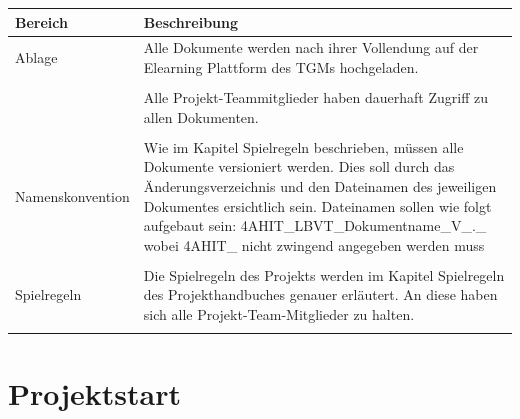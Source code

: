 \begingroup
\renewcommand*{\arraystretch}{1.1} %
\begin{center}
\begin{tabularx}{\textwidth}{|p{3.2cm}|X|}

    \hline
     \color{white}\textbf{Bereich} & \color{white}\textbf{Beschreibung} \\
    \hline
    Ablage & Alle Dokumente werden nach ihrer Vollendung auf der Elearning Plattform des TGMs hochgeladen. \\
    & \\
    \hline
     & Alle Projekt-Teammitglieder haben dauerhaft Zugriff zu allen Dokumenten.\\
    & \\
    \hline
    Namenskonvention & Wie im Kapitel Spielregeln beschrieben, müssen alle Dokumente versioniert werden. Dies soll durch das Änderungsverzeichnis und den Dateinamen des jeweiligen Dokumentes ersichtlich sein. \newline \newline Dateinamen sollen wie folgt aufgebaut sein:  
    \newline 4AHIT\_LBVT\_Dokumentname\_V\_.\_ 
    \newline \newline wobei 4AHIT\_ nicht zwingend angegeben werden muss \\
    & \\
    \hline
    Spielregeln & Die Spielregeln des Projekts werden im Kapitel Spielregeln des Projekthandbuches genauer erläutert. An diese haben sich alle Projekt-Team-Mitglieder zu halten.\\
    & \\
    \hline
\end{tabularx}
\end{center}
\endgroup

\newpage

\section{Projektstart}
